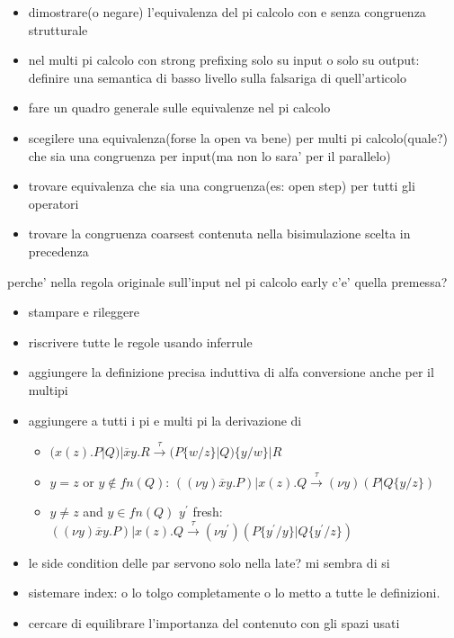 




\begin{itemize}
  \item
    dimostrare(o negare) l'equivalenza del pi calcolo con e senza congruenza strutturale
  \item
    nel multi pi calcolo con strong prefixing solo su input o solo su output: definire una semantica di basso livello sulla falsariga di quell'articolo
  \item
    fare un quadro generale sulle equivalenze nel pi calcolo
  \item
    scegilere una equivalenza(forse la open va bene) per multi pi calcolo(quale?) che sia una congruenza per input(ma non lo sara' per il parallelo)
  \item
    trovare equivalenza che sia una congruenza(es: open step) per tutti gli operatori
  \item
    trovare la congruenza coarsest contenuta nella bisimulazione scelta in precedenza
\end{itemize}

perche' nella regola originale sull'input nel pi calcolo early c'e' quella premessa?


\begin{itemize}
  \item 	
    stampare e rileggere
  \item
    riscrivere tutte le regole usando inferrule
  \item
    aggiungere la definizione precisa induttiva di alfa conversione anche per il multipi
  \item
    aggiungere a tutti i pi e multi pi la derivazione di
    \begin{itemize}
      \item 
	$(x(z).P|Q)|\overline{x}y.R \xrightarrow{\tau} (P\{w/z\}|Q)\{y/w\}|R$ 
      \item
	$y=z$ or $y\notin fn(Q)$: $((\nu y) \overline{x}y.P)| x(z).Q \xrightarrow{\tau} (\nu y)(P|Q\{y/z\})$
      \item
	$y\neq z$ and $y\in fn(Q)$  $y^{'}$ fresh: $((\nu y) \overline{x}y.P)| x(z).Q \xrightarrow{\tau} (\nu y^{'})(P\{y^{'}/y\}|Q\{y^{'}/z\})$
    \end{itemize}
  \item	
    le side condition delle par servono solo nella late? mi sembra di si
  \item
    sistemare index: o lo tolgo completamente o lo metto a tutte le definizioni.
  \item	
    cercare di equilibrare l'importanza del contenuto con gli spazi usati
\end{itemize}
